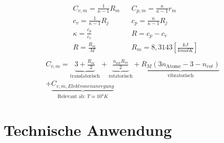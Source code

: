 \documentclass[twocolumn]{article}
\begin{document}
\begin{align*}
	&	C_{v,m} = \frac{1}{\kappa - 1} R_m
		&&C_{p,m} = \frac{\kappa}{\kappa -1}r_m \\
	&	c_v = \frac{1}{\kappa - 1 }R_j 
		&&c_p = \frac{\kappa}{\kappa -1}R_j \\
	&	\kappa = \frac{c_p}{c_v}
	&&R = c_p - c_v \\
	&R = \frac{R_m}{M}
	&&R_m = 8,3143\left[\frac{kJ}{kmolK}\right] \\
	\end{align*}
	\begin{multline*}
		C_{v,m} = \underbrace{3 + \frac{R_m}{2}}_{\text{translatorisch}} + \underbrace{\frac{n_{\text{rot}}  R_m}{2}}_{\text{rotatorisch}}  
		+ \underbrace{R_M ( 3n_{\text{Atome}} - 3 - n_{rot})}_{\text{vibratorisch}}  \\
		+ \underbrace{C_{v,m,Elektronenanregung}}_{\text{Relevant ab: }T \approx 10^4K } 
	\end{multline*}
%                                                         

\onecolumn
\section{Technische Anwendung}
\end{document}

